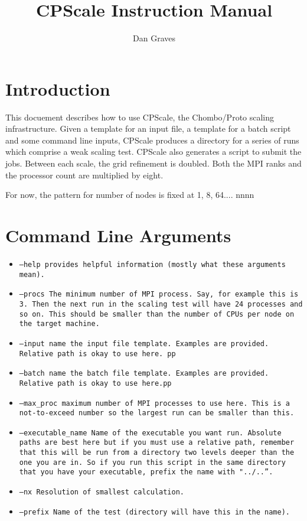 \documentclass{article}
\title{CPScale Instruction Manual}
\author{Dan Graves}
\begin{document}
\maketitle
\section{Introduction}

This docuement describes how to use CPScale, the Chombo/Proto scaling
infrastructure.    Given a template for an input file, a template for
a batch script and some command line inputs, CPScale produces a
directory  for a series of runs which comprise a weak scaling test.
CPScale also generates a script to submit the jobs.   Between each
scale, the grid refinement is doubled.   Both the MPI ranks and the
processor count are multiplied by eight.

For now, the pattern for number of nodes is fixed at 1, 8, 64....
nnnn
\section{Command Line Arguments}
  \begin{itemize}
\item \tt{--help} provides helpful information (mostly what these
  arguments mean).
\item \tt{--procs}  The minimum number of MPI process.  Say, for
  example this is 3.   Then the next run in the scaling test will have
  24 processes and so on.   This should be smaller than the number of
  CPUs per node on the target machine.
\item \tt{--input} name the input file template.   Examples are
  provided.   Relative path is okay to use here.  pp
\item \tt{--batch} name the batch file template.   Examples are
  provided.   Relative path is okay to use here.pp
\item \tt{--max\_proc}  maximum number of MPI processes to use here.
  This is a not-to-exceed number so the largest run can be smaller
  than this.
\item \tt{--executable\_name} Name of the executable you want run.
  Absolute paths are best here but if you must use a relative path,
  remember that this will be run from a directory two levels deeper
  than the one you are in.   So if you run this script in the same
  directory that you have your executable, prefix the name with
  "../..''.
\item \tt{--nx}  Resolution of smallest calculation.
\item \tt{--prefix} Name of the test (directory will have this in the name).  
\end{itemize}
\end{document}
